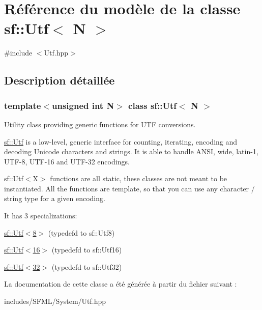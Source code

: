\hypertarget{classsf_1_1Utf}{}\section{Référence du modèle de la classe sf\+:\+:Utf$<$ N $>$}
\label{classsf_1_1Utf}


{\ttfamily \#include $<$Utf.\+hpp$>$}



\subsection{Description détaillée}
\subsubsection*{template$<$unsigned int N$>$\newline
class sf\+::\+Utf$<$ N $>$}

Utility class providing generic functions for U\+TF conversions.

\hyperlink{classsf_1_1Utf}{sf\+::\+Utf} is a low-\/level, generic interface for counting, iterating, encoding and decoding Unicode characters and strings. It is able to handle A\+N\+SI, wide, latin-\/1, U\+T\+F-\/8, U\+T\+F-\/16 and U\+T\+F-\/32 encodings.

sf\+::\+Utf$<$\+X$>$ functions are all static, these classes are not meant to be instantiated. All the functions are template, so that you can use any character / string type for a given encoding.

It has 3 specializations\+: \begin{DoxyItemize}
\item \hyperlink{classsf_1_1Utf_3_018_01_4}{sf\+::\+Utf$<$8$>$} (typedef\textquotesingle{}d to sf\+::\+Utf8) \item \hyperlink{classsf_1_1Utf_3_0116_01_4}{sf\+::\+Utf$<$16$>$} (typedef\textquotesingle{}d to sf\+::\+Utf16) \item \hyperlink{classsf_1_1Utf_3_0132_01_4}{sf\+::\+Utf$<$32$>$} (typedef\textquotesingle{}d to sf\+::\+Utf32) \end{DoxyItemize}


La documentation de cette classe a été générée à partir du fichier suivant \+:\begin{DoxyCompactItemize}
\item 
includes/\+S\+F\+M\+L/\+System/Utf.\+hpp\end{DoxyCompactItemize}
